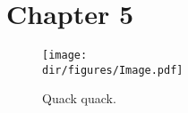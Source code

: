 
\chapter{Chapter 5}
\label{ch:chapter-5}

\lipsum[1-6]


\begin{figure}[t]
	\centering
	\texttt{[image: \\dir/figures/Image.pdf]}
	\caption{Quack quack.}
	\label{fig:Duck5}
\end{figure}